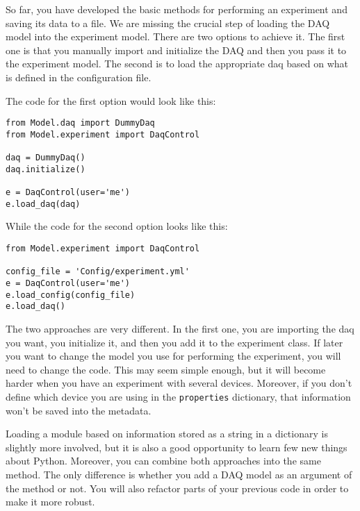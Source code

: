 
So far, you have developed the basic methods for performing an
experiment and saving its data to a file. We are missing the crucial
step of loading the {DAQ} model into the experiment model. There are two
options to achieve it. The first one is that you manually import and
initialize the {DAQ} and then you pass it to the experiment model. The
second is to load the appropriate daq based on what is defined in the
configuration file.

The code for the first option would look like this:

\begin{verbatim}
from Model.daq import DummyDaq
from Model.experiment import DaqControl

daq = DummyDaq()
daq.initialize()

e = DaqControl(user='me')
e.load_daq(daq)
\end{verbatim}

While the code for the second option looks like this:

\begin{verbatim}
from Model.experiment import DaqControl

config_file = 'Config/experiment.yml'
e = DaqControl(user='me')
e.load_config(config_file)
e.load_daq()
\end{verbatim}

The two approaches are very different. In the first one, you are
importing the daq you want, you initialize it, and then you add it to
the experiment class. If later you want to change the model you use for
performing the experiment, you will need to change the code. This may
seem simple enough, but it will become harder when you have an
experiment with several devices. Moreover, if you don't define which
device you are using in the \texttt{properties} dictionary, that
information won't be saved into the metadata.

Loading a module based on information stored as a string in a dictionary
is slightly more involved, but it is also a good opportunity to learn
few new things about Python. Moreover, you can combine both approaches
into the same method. The only difference is whether you add a {DAQ}
model as an argument of the method or not. You will also refactor parts
of your previous code in order to make it more robust.

